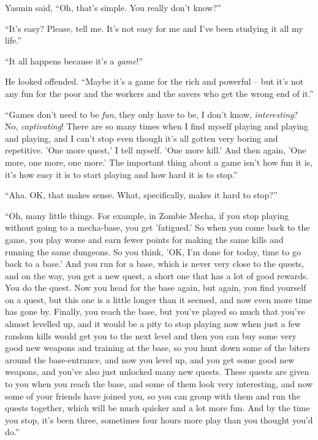 Yasmin said, ``Oh, that's simple. You really don't know?''

``It's easy? Please, tell me. It's not easy for me and I've been
studying it all my life.''

``It all happens because it's a \emph{game}!''

He looked offended. ``Maybe it's a game for the rich and powerful --
but it's not any fun for the poor and the workers and the savers
who get the wrong end of it.''

``Games don't need to be \emph{fun}, they only have to be, I don't
know, \emph{interesting}? No, \emph{captivating}! There are so many
times when I find myself playing and playing and playing, and I
can't stop even though it's all gotten very boring and repetitive.
'One more quest,' I tell myself. 'One more kill.' And then again,
'One more, one more, one more.' The important thing about a game
isn't how fun it is, it's how easy it is to start playing and how
hard it is to stop.''

``Aha. OK, that makes sense. What, specifically, makes it hard to
stop?''

``Oh, many little things. For example, in Zombie Mecha, if you stop
playing without going to a mecha-base, you get 'fatigued.' So when
you come back to the game, you play worse and earn fewer points for
making the same kills and running the same dungeons. So you think,
'OK, I'm done for today, time to go back to a base.' And you run
for a base, which is never very close to the quests, and on the
way, you get a new quest, a short one that has a lot of good
rewards. You do the quest. Now you head for the base again, but
again, you find yourself on a quest, but this one is a little
longer than it seemed, and now even more time has gone by. Finally,
you reach the base, but you've played so much that you've almost
levelled up, and it would be a pity to stop playing now when just a
few random kills would get you to the next level and then you can
buy some very good new weapons and training at the base, so you
hunt down some of the biters around the base-entrance, and now you
level up, and you get some good new weapons, and you've also just
unlocked many new quests. These quests are given to you when you
reach the base, and some of them look very interesting, and now
some of your friends have joined you, so you can group with them
and run the quests together, which will be much quicker and a lot
more fun. And by the time you stop, it's been three, sometimes four
hours more play than you thought you'd do.''

